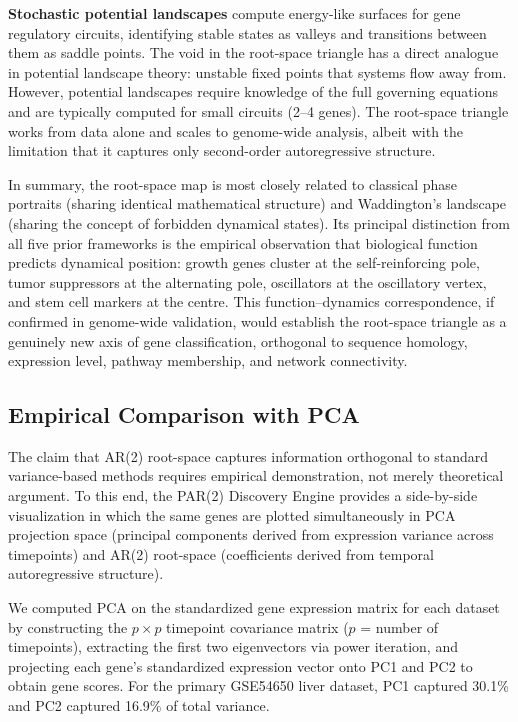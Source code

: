\documentclass[11pt,letterpaper]{article}
\begin{document}
\textbf{Stochastic potential landscapes} \citep{wang2011} compute energy-like surfaces for gene regulatory circuits, identifying stable states as valleys and transitions between them as saddle points. The void in the root-space triangle has a direct analogue in potential landscape theory: unstable fixed points that systems flow away from. However, potential landscapes require knowledge of the full governing equations and are typically computed for small circuits (2--4 genes). The root-space triangle works from data alone and scales to genome-wide analysis, albeit with the limitation that it captures only second-order autoregressive structure.

In summary, the root-space map is most closely related to classical phase portraits (sharing identical mathematical structure) and Waddington's landscape (sharing the concept of forbidden dynamical states). Its principal distinction from all five prior frameworks is the empirical observation that biological function predicts dynamical position: growth genes cluster at the self-reinforcing pole, tumor suppressors at the alternating pole, oscillators at the oscillatory vertex, and stem cell markers at the centre. This function--dynamics correspondence, if confirmed in genome-wide validation, would establish the root-space triangle as a genuinely new axis of gene classification, orthogonal to sequence homology, expression level, pathway membership, and network connectivity.

\subsection{Empirical Comparison with PCA}
\label{sec:pca_comparison}

The claim that AR(2) root-space captures information orthogonal to standard variance-based methods requires empirical demonstration, not merely theoretical argument. To this end, the PAR(2) Discovery Engine provides a side-by-side visualization in which the same genes are plotted simultaneously in PCA projection space (principal components derived from expression variance across timepoints) and AR(2) root-space (coefficients derived from temporal autoregressive structure).

We computed PCA on the standardized gene expression matrix for each dataset by constructing the $p \times p$ timepoint covariance matrix ($p$ = number of timepoints), extracting the first two eigenvectors via power iteration, and projecting each gene's standardized expression vector onto PC1 and PC2 to obtain gene scores. For the primary GSE54650 liver dataset, PC1 captured 30.1\% and PC2 captured 16.9\% of total variance.
\end{document}
